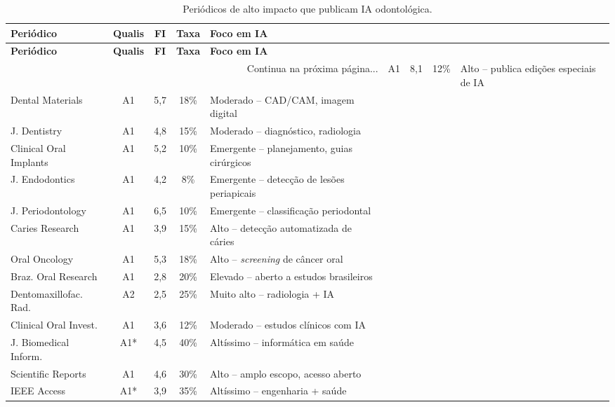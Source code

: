  

\begin{longtable}{lcccp{4cm}}
  \caption{Periódicos de alto impacto que publicam IA odontológica.}
  \label{tab:periodicos-ia} \\
  \toprule
  \textbf{Periódico} & \textbf{Qualis} & \textbf{FI} & \textbf{Taxa} & \textbf{Foco em IA} \\
  \midrule
  \endfirsthead
  \toprule
  \textbf{Periódico} & \textbf{Qualis} & \textbf{FI} & \textbf{Taxa} & \textbf{Foco em IA} \\
  \midrule
  \endhead
  \bottomrule
  \multicolumn{5}{r}{\footnotesize Continua na próxima página...}
  \endfoot
  \bottomrule
  \endlastfoot
  J. Dental Research      & A1 & 8,1 & 12\%  & Alto -- publica edições especiais de IA \\
  Dental Materials         & A1 & 5,7 & 18\%  & Moderado -- CAD/CAM, imagem digital \\
  J. Dentistry            & A1 & 4,8 & 15\%  & Moderado -- diagnóstico, radiologia \\
  Clinical Oral Implants  & A1 & 5,2 & 10\%  & Emergente -- planejamento, guias cirúrgicos \\
  J. Endodontics          & A1 & 4,2 & 8\%   & Emergente -- detecção de lesões periapicais \\
  J. Periodontology       & A1 & 6,5 & 10\%  & Emergente -- classificação periodontal \\
  Caries Research         & A1 & 3,9 & 15\%  & Alto -- detecção automatizada de cáries \\
  Oral Oncology           & A1 & 5,3 & 18\%  & Alto -- \textit{screening} de câncer oral \\
  Braz. Oral Research     & A1 & 2,8 & 20\%  & Elevado -- aberto a estudos brasileiros \\
  Dentomaxillofac. Rad.   & A2 & 2,5 & 25\%  & Muito alto -- radiologia + IA \\
  Clinical Oral Invest.   & A1 & 3,6 & 12\%  & Moderado -- estudos clínicos com IA \\
  J. Biomedical Inform.   & A1* & 4,5 & 40\%  & Altíssimo -- informática em saúde \\
  Scientific Reports      & A1 & 4,6 & 30\%  & Alto -- amplo escopo, acesso aberto \\
  IEEE Access             & A1* & 3,9 & 35\%  & Altíssimo -- engenharia + saúde \\
\end{longtable}

